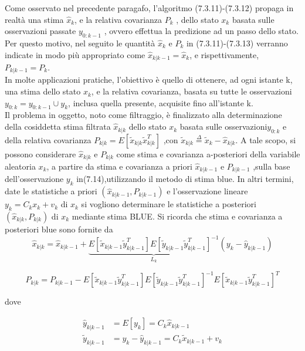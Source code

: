 Come osservato nel precedente paragafo, l’algoritmo (7.3.11)-(7.3.12) propaga in realtà
una stima $\hat{x}_k$, e la relativa covarianza $P_k$ , dello stato $x_k$ basata sulle osservazioni passate
$y_{0:k-1}$ , ovvero effettua la predizione ad un passo dello stato. Per questo motivo, nel seguito
le quantità $\hat{x}_k$ e $P_k$ in (7.3.11)-(7.3.13) verranno indicate in modo più appropriato come $\hat{x}_{k|k-1}=\hat{x}_k$, e rispettivamente, $P_{k|k-1}=P_k$.\\
In molte applicazioni pratiche, l’obiettivo è quello di ottenere, ad ogni istante k, una stima dello stato $x_k$, e la relativa covarianza, basata su tutte le osservazioni $y_{0:k}  = y_{0:k-1}\cup{y_k}$, inclusa quella presente, acquisite fino all’istante k.\\
Il problema in oggetto, noto come filtraggio, è finalizzato alla determinazione della cosiddetta stima filtrata $\hat{ x}_{ k|k}$ dello stato $x_k$ basata sulle osservazioni$y_{0:k}$ e della relativa covarianza $P_{k|k} = E[\tilde{x}_{k|k}\tilde{x}_{k|k}^T]$ ,con $\tilde{x}_{k|k}\stackrel{\Delta}{=}\tilde{x}_k-\hat{x}_{k|k}$.
A tale scopo, si possono considerare $\hat{x}_{k|k}$ e  $P_{k|k}$ come stima e covarianza a-posteriori della variabile aleatoria $x_k$, a partire da stima e covarianza a priori $\hat{x}_{k|k-1}$ e $P_{k|k-1}$ ,sulla base dell'osservazione $y_k$ in(7.14),utilizzando il metodo di stima blue. In altri termini, date le statistiche a priori $(\hat{x}_{k|k-1},P_{k|k-1})$ e l’osservazione lineare $y_k=C_kx_k+v_k$ di $x_k$ si vogliono determinare le statistiche a posteriori $(\hat{x}_{k|k},P_{k|k})$ di $x_k$ mediante stima BLUE. Si ricorda che stima e covarianza a posteriori blue sono fornite da\\
\begin{equation}
\hat{x}_{k|k}=\hat{x}_{k|k-1}+\underbrace{E[\tilde{x}_{k|k-1}\tilde{y}_{k|k-1}^T]E[\tilde{y}_{k|k-1}\tilde{y}_{k|k-1}^T]^{-1}}_{L_k}(y_k-\hat{y}_{k|k-1})
\end{equation}

\begin{equation}
P_{k|k}=P_{k|k-1}-E[\tilde{x}_{k|k-1}\tilde{y}_{k|k-1}^T]E[\tilde{y}_{k|k-1}\tilde{y}_{k|k-1}^T]^{-1}E[\tilde{x}_{k|k-1}\tilde{y}_{k|k-1}^T]^T
\end{equation}

dove

\begin{align}
\hat{y}_{k|k-1} &= E[y_k]=C_k\hat{x}_{k|k-1} \\
\tilde{y}_{k|k-1} &= y_k-\hat{y}_{k|k-1}=C_k\tilde{x}_{k|k-1}+v_k
\end{align}


